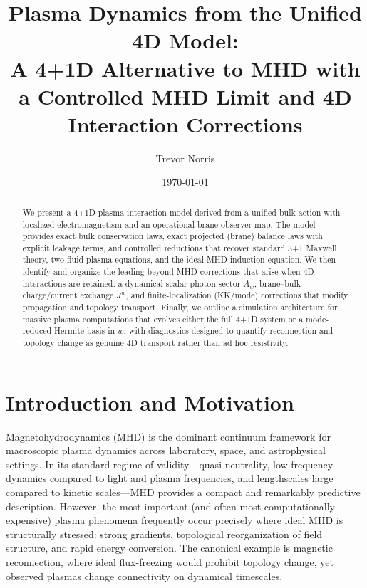 \documentclass[11pt]{article}
\title{Plasma Dynamics from the Unified 4D Model:\\
A 4+1D Alternative to MHD with a Controlled MHD Limit and 4D Interaction Corrections}
\author{Trevor Norris}
\date{\today}
\begin{document}
\maketitle

\begin{abstract}

We present a 4+1D plasma interaction model derived from a unified bulk action with localized electromagnetism and an operational brane-observer map. The model provides exact bulk conservation laws, exact projected (brane) balance laws with explicit leakage terms, and controlled reductions that recover standard 3+1 Maxwell theory, two-fluid plasma equations, and the ideal-MHD induction equation. We then identify and organize the leading beyond-MHD corrections that arise when 4D interactions are retained: a dynamical scalar-photon sector \(A_w\), brane--bulk charge/current exchange \(J^w\), and finite-localization (KK/mode) corrections that modify propagation and topology transport. Finally, we outline a simulation architecture for massive plasma computations that evolves either the full 4+1D system or a mode-reduced Hermite basis in \(w\), with diagnostics designed to quantify reconnection and topology change as genuine 4D transport rather than ad hoc resistivity.
\end{abstract}

\section{Introduction and Motivation}
\label{sec:intro}

Magnetohydrodynamics (MHD) is the dominant continuum framework for macroscopic plasma dynamics across laboratory, space, and astrophysical settings. In its standard regime of validity---quasi-neutrality, low-frequency dynamics compared to light and plasma frequencies, and lengthscales large compared to kinetic scales---MHD provides a compact and remarkably predictive description. However, the most important (and often most computationally expensive) plasma phenomena frequently occur precisely where ideal MHD is structurally stressed: strong gradients, topological reorganization of field structure, and rapid energy conversion. The canonical example is magnetic reconnection, where ideal flux-freezing would prohibit topology change, yet observed plasmas change connectivity on dynamical timescales.
\end{document}
